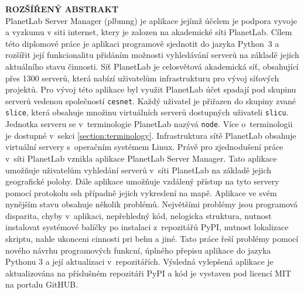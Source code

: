 \documentclass[%
  12pt,       				%
  a4paper,    				%
	unicode,						%
]{report}				    	%
\begin{document}
\cleardoublepage
\noindent
{\large\sffamily\bfseries\MakeUppercase{Rozšířený abstrakt}}
\\
PlanetLab Server Manager (plbmng) je aplikace jejímž účelem je podpora vyvoje a vyzkumu v siti internet, ktery je zalozen na akademické síti PlanetLab. Cílem této diplomové práce je aplikaci programově sjednotit do jazyka Python~3 a rozšířit její funkcionalitu přidáním možnosti vyhledávání serverů na základě jejich aktuálního stavu činnosti. Síť PlanetLab je celosvětová akademická síť, obsahující přes 1300 serverů, která nabízí uživatelům infrastrukturu pro vývoj síťových projektů. Pro vývoj této aplikace byl využit PlanetLab účet spadají pod skupinu serverů vedenou společností \texttt{cesnet}. Každý uživatel je přiřazen do skupiny zvané \texttt{slice}, která obsahuje množinu virtuálních serverů dostupných uživateli \texttt{slicu}. Jednotka serveru se v~terminologie PlanetLab nazývá \texttt{node}. Více o~terminologii je dostupné v~sekci \ref{section:terminology}. Infrastruktura sítě PlanetLab obsahuje virtuální servery s~operačním systémem Linux. Právě pro zjednodušení práce v~síti PlanetLab vznikla aplikace PlanetLab Server Manager. Tato aplikace umožňuje uživatelům vyhledání serverů v~síti PlanetLab na základě jejich geografické polohy. Dále aplikace umožňuje vzdálený přístup na tyto servery pomocí protokolu ssh případně jejich vykreslení na mapě. Aplikace ve svém nynějším stavu obsahuje několik problémů. Největšími problémy jsou programová disparita, chyby v~aplikaci, nepřehledný kód, nelogicka struktura, nutnost instalovat systémové balíčky po instalaci z~repozitářů PyPI, nutnost lokalizace skriptu, nahle ukonceni cinnosti pri behu a jiné. Tato práce řeší problémy pomocí nového návrhu programových funkcní, úplného přepisu aplikace do jazyka Pythonu 3 a její aktualizaci v~repozitářích. Výsledná vylepšená aplikace je aktualizována na příslušném repozitáři PyPI a kód je vystaven pod licencí MIT na portalu GitHUB.\\
\end{document}
